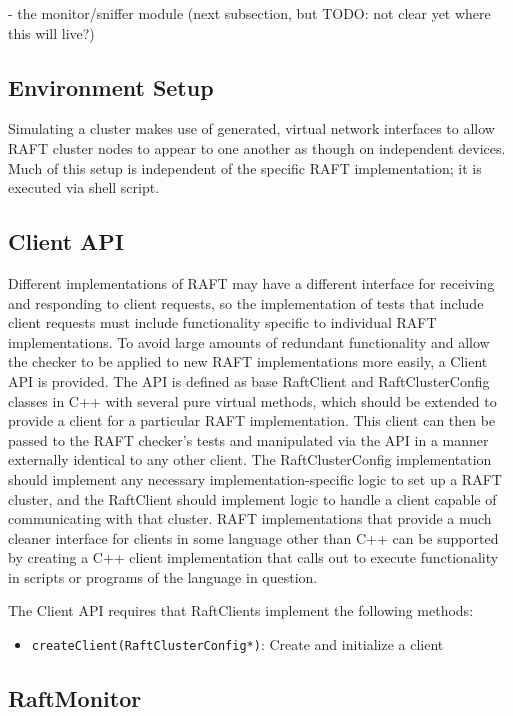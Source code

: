 \documentclass[UTF8]{article}
\begin{document}
- the monitor/sniffer module (next subsection, but TODO: not clear yet where this will live?)

\subsection{Environment Setup}

Simulating a cluster makes use of generated, virtual network interfaces to allow RAFT cluster nodes to appear to one another as though on independent devices. Much of this setup is independent of the specific RAFT implementation; it is executed via shell script.

\subsection{Client API}

Different implementations of RAFT may have a different interface for receiving and responding to client requests, so the implementation of tests that include client requests must include functionality specific to individual RAFT implementations. To avoid large amounts of redundant functionality and allow the checker to be applied to new RAFT implementations more easily, a Client API is provided. The API is defined as base RaftClient and RaftClusterConfig classes in C++ with several pure virtual methods, which should be extended to provide a client for a particular RAFT implementation. This client can then be passed to the RAFT checker's tests and manipulated via the API in a manner externally identical to any other client. The RaftClusterConfig implementation should implement any necessary implementation-specific logic to set up a RAFT cluster, and the RaftClient should implement logic to handle a client capable of communicating with that cluster. RAFT implementations that provide a much cleaner interface for clients in some language other than C++ can be supported by creating a C++ client implementation that calls out to execute functionality in scripts or programs of the language in question.

The Client API requires that RaftClients implement the following methods:

\begin{itemize}
\item \texttt{createClient(RaftClusterConfig*)}: Create and initialize a client  
\end{itemize}

\subsection{RaftMonitor}
\end{document}
